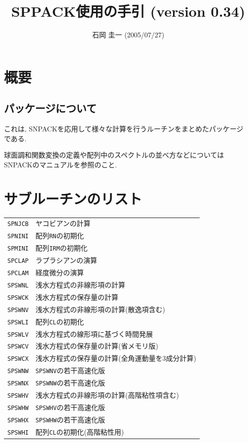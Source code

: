 \documentclass[a4j,fleqn]{jarticle}
\title{SPPACK使用の手引 (version 0.34)}
\author{石岡 圭一  (2005/07/27)}
\date{}
\begin{document}
\maketitle

\section{概要}

\subsection{パッケージについて}

これは, SNPACKを応用して様々な計算を行うルーチンをまとめたパッケージ
である.

球面調和関数変換の定義や配列中のスペクトルの並べ方などについては
SNPACKのマニュアルを参照のこと.


\section{サブルーチンのリスト}

\vspace{1em}
\begin{tabular}{ll}
{\tt SPNJCB} & ヤコビアンの計算\\
{\tt SPNINI} & 配列{\tt RN}の初期化\\
{\tt SPMINI} & 配列{\tt IRM}の初期化\\
{\tt SPCLAP} & ラプラシアンの演算\\
{\tt SPCLAM} & 経度微分の演算\\
{\tt SPSWNL} & 浅水方程式の非線形項の計算\\
{\tt SPSWCK} & 浅水方程式の保存量の計算\\
{\tt SPSWNV} & 浅水方程式の非線形項の計算(散逸項含む)\\
{\tt SPSWLI} & 配列{\tt CL}の初期化\\
{\tt SPSWLV} & 浅水方程式の線形項に基づく時間発展\\
{\tt SPSWCV} & 浅水方程式の保存量の計算(省メモリ版)\\
{\tt SPSWCX} & 浅水方程式の保存量の計算(全角運動量を3成分計算)\\
{\tt SPSWNW} & {\tt SPSWNV}の若干高速化版\\
{\tt SPSWNX} & {\tt SPSWNW}の若干高速化版\\
{\tt SPSWHV} & 浅水方程式の非線形項の計算(高階粘性項含む)\\
{\tt SPSWHW} & {\tt SPSWHV}の若干高速化版\\
{\tt SPSWHX} & {\tt SPSWHW}の若干高速化版\\
{\tt SPSWHI} & 配列{\tt CL}の初期化(高階粘性用)
\end{tabular}
\end{document}
